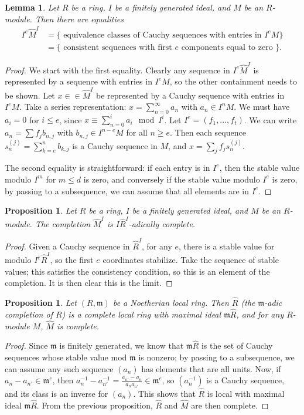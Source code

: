 \documentclass{amsart}[12pt]
\newcommand{\fm}{{\mathfrak m}}
\numberwithin{equation}{section}
\theoremstyle{plain} %
\newtheorem{lem}[equation]{Lemma}
\newtheorem{prop}[equation]{Proposition}
\theoremstyle{definition}
\theoremstyle{remark}
\begin{document}
 \begin{lem} Let $R$ be a ring, $I$ be a finitely generated ideal, and $M$ be an $R$-module. Then there are equalities
 \[\begin{aligned} 
  I^e \hat{M}^I &= \{ \text{ equivalence classes of Cauchy sequences with entries in }I^e M\} \\
  &= \{ \text{ consistent sequences with first $e$ components equal to zero }\}.\end{aligned}\]
  \end{lem}
 \begin{proof} We start with the first equality. Clearly any sequence in $I^e \hat{M}^I$ is represented by a sequence with entries in $I^e M$, so the other containment needs to be shown. Let $x\in \in \hat{M}^I$ be represented by a Cauchy sequence with entries in $I^e M$. Take a series representation: $x= \sum_{n=0}^\infty a_n$ with $a_n\in I^n M$. We must have $a_i=0$ for $i\leq e$, since $x \equiv \sum_{n=0}^i a_i \mod I^i$. Let $I^e=(f_1,\dots,f_t)$. We can write $a_{n} = \sum f_j b_{n,j}$ with $b_{n,j}\in I^{n-e} M$ for all $n\geq e$. Then each sequence $s_n^{(j)} = \sum_{k=e}^{n} b_{k,j}$ is a Cauchy sequence in $M$, and $x=\sum_j f_j s_n^{(j)}$.
 
 The second equality is straightforward: if each entry is in $I^e$, then the stable value modulo $I^m$ for $m\leq d$ is zero, and conversely if the stable value modulo $I^e$ is zero, by passing to a subsequence, we can assume that all elements are in $I^e$.
 \end{proof}
 
  \begin{prop} Let $R$ be a ring, $I$ be a finitely generated ideal, and $M$ be an $R$-module. The completion $\hat{M}^I$ is $I\hat{R}^I$-adically complete.
 \end{prop}
 \begin{proof}
 Given a Cauchy sequence in $\hat{R}^I$, for any $e$, there is a stable value for modulo $I^e \hat{R}^I$, so the first $e$ coordinates stabilize. Take the sequence of stable values; this satisfies the consistency condition, so this is an element of the completion. It is then clear this is the limit.
\end{proof}

\begin{prop}
Let $(R,\fm)$ be a Noetherian local ring. Then $\hat{R}$ (the $\fm$-adic completion of $R$) is a complete local ring with maximal ideal $\fm\hat{R}$, and for any $R$-module $M$, $\hat{M}$ is complete.
\end{prop}
\begin{proof}
Since $\fm$ is finitely generated, we know that $\fm\hat{R}$ is the set of Cauchy sequences whose stable value mod $\fm$ is nonzero; by passing to a subsequence, we can assume any such sequence $(a_n)$ has elements that are all units. Now, if $a_n - a_{n'} \in \fm^e$, then $a_n^{-1} - a_{n'}^{-1} = \frac{a_{n'} - a_n}{a_n a_{n'}} \in \fm^e$, so $(a_n^{-1})$ is a Cauchy sequence, and its class is an inverse for $(a_n)$. This shows that $\hat{R}$ is local with maximal ideal $\fm\hat{R}$. 
From the previous proposition, $\hat{R}$ and $\hat{M}$ are then complete.
\end{proof}
\end{document}
